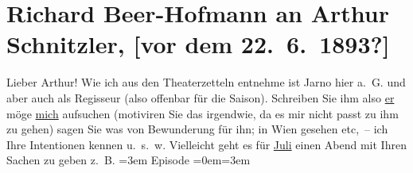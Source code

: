 

         
         \renewcommand{\erwaehntePersonen}{Personen: Benedikt Felix, Josef Jarno}
         \renewcommand{\erwaehnteOrte}{Orte: Bad Ischl, Wien}
         \renewcommand{\erwaehnteWerke}{Werke: Abschiedssouper, Anatols Hochzeitsmorgen, Episode, Signor Formica. Komische Oper in drei Akten}
               \section[Richard Beer-Hofmann an Arthur Schnitzler, {[}vor dem 22. 6. 1893?{]}]{ Richard Beer-Hofmann an Arthur Schnitzler, {[}vor dem
               22. 6. 1893?{]}}\nopagebreak{}\rehead{ }\begin{ledgroupsized}[t]{13cm}\normalsize\beginnumbering \toendnotes[C]{\smallbreak\pagebreak[2]} 
\toendnotes[C]{\smallbreak}\pstart
           \noindent{}\textcolor{gray}{\textbf{\label{T_L00223-1v}\label{T_L00223-1h}}}\pend
           \pstart{}{\pb}Lieber Arthur!\pend\pstart
           Wie ich aus den Theaterzetteln entnehme ist Jarno
               hier a. G. und aber auch als Regisseur (also offenbar für die Saison). Schreiben Sie
               ihm also \uline{er} möge \uline{mich}
               aufsuchen (motiviren Sie das irgendwie, da es mir nicht passt zu ihm zu gehen) sagen
                  {\pb}Sie was von Bewunderung für
               ihn; in Wien gesehen etc, – ich Ihre Intentionen
               kennen u. s. w. Vielleicht geht es für \uline{Juli} einen Abend mit Ihren Sachen zu geben z. B.\pend
           \leftskip=3em{}\pstart
           \noindent{}Episode\pend
           \leftskip=0em{}\leftskip=3em{}\pstart

\end{ledgroupsized}
